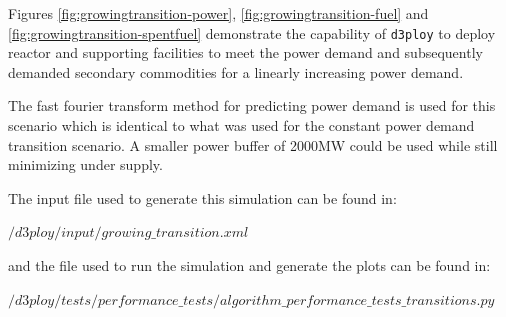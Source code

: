 \documentclass[11pt,letterpaper]{article}
\newcommand{\deploy}{\texttt{d3ploy}\xspace}%
\begin{document}
Figures \ref{fig:growingtransition-power}, \ref{fig:growingtransition-fuel}
and \ref{fig:growingtransition-spentfuel} demonstrate the capability 
of \deploy to deploy reactor and supporting facilities to meet the
power demand and subsequently demanded secondary commodities 
for a linearly increasing power demand. 

The fast fourier transform method for predicting power demand is used for 
this scenario
which is identical to what was used for the constant power demand 
transition scenario. 
A smaller power buffer of 2000MW could be used while still 
minimizing under supply. 

The input file used to generate this simulation can be found in:

\noindent
$/d3ploy/input/growing\_transition.xml$

\noindent
and the file used to run the simulation and generate the plots can be found in:

\noindent
$/d3ploy/tests/performance\_tests/algorithm\_performance\_tests\_transitions.py$
\end{document}
